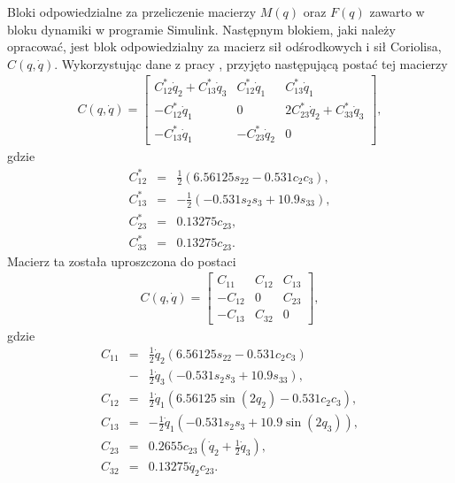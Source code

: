 \documentclass[eng,printmode]{mgr}
\begin{document}
  
Bloki odpowiedzialne za przeliczenie macierzy $M(q)$ oraz $F(q)$ zawarto w bloku dynamiki w programie Simulink.
Następnym blokiem, jaki należy opracować, jest blok odpowiedzialny za macierz sił odśrodkowych i sił Coriolisa, $C(q, \dot{q})$. Wykorzystując dane z pracy \cite{b4}, przyjęto następującą postać tej macierzy
 \begin{eqnarray}
 C(q, \dot{q})=  \left[
        \begin{array}{ccc}
         C_{12}^*\dot{q}_2+C_{13}^*\dot{q}_3 & C_{12}^*\dot{q}_1 & C_{13}^*\dot{q}_1\\ 
         -C_{12}^*\dot{q}_1 & 0 & 2C_{23}^*\dot{q}_2+C_{33}^*\dot{q}_3\\
         -C_{13}^*\dot{q}_1 & -C_{23}^*\dot{q}_2 & 0
         \end{array}
      \right],
 \end{eqnarray}
 gdzie
  \begin{eqnarray}
C_{12}^* &=& \frac{1}{2}(6.56125s_{22}-0.531c_2c_3),\nonumber\\
C_{13}^* &=& -\frac{1}{2}(-0.531s_2s_3+10.9s_{33}),\nonumber  \\
C_{23}^* &=& 0.13275c_{23}, \nonumber\\
C_{33}^* &=& 0.13275c_{23} . \end{eqnarray}
   Macierz ta została uproszczona do postaci
  \begin{eqnarray}
C(q, \dot{q})=  \left[
        \begin{array}{ccc}
         C_{11} & C_{12} & C_{13}\\ 
         -C_{12} & 0 & C_{23}\\
         -C_{13} & C_{32} & 0
         \end{array}
      \right],
 \end{eqnarray}
 gdzie \\
 \begin{eqnarray}
C_{11} &=& \frac{1}{2}\dot{q}_2(6.56125s_{22}-0.531c_2c_3)\nonumber\\
&-&\frac{1}{2}\dot{q}_3(-0.531s_2s_3+10.9s_{33}), \nonumber\\
C_{12} &=& \frac{1}{2}\dot{q}_1(6.56125\sin(2q_2)-0.531c_2c_3), \nonumber  \\
C_{13} &=& -\frac{1}{2}\dot{q}_1(-0.531s_2s_3+10.9\sin(2q_3)), \nonumber \\
C_{23} &=& 0.2655c_{23}(\dot{q}_2+\frac{1}{2}\dot{q}_3), \nonumber \\
C_{32} &=& 0.13275\dot{q}_2c_{23}.\nonumber\\
\end{eqnarray}
\end{document}
